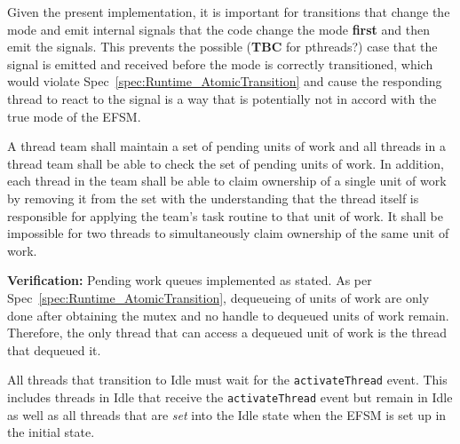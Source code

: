 \documentclass{article}
\newcommand{\taskroutine}        {task routine\xspace}
\begin{document}
Given the present implementation, it is important for transitions that
change the mode and emit internal signals that the code change the mode
\textbf{first} and then emit the signals.  This prevents the possible
(\textbf{TBC} for pthreads?) case that the signal is emitted and received before
the mode is correctly transitioned, which would violate
Spec~\ref{spec:Runtime_AtomicTransition} and cause the responding thread
to react to the signal is a way that is potentially not in accord with the true
mode of the EFSM.

\begin{spec}
A thread team shall maintain a set of pending units of work and all threads in a
thread team shall be able to check the set of pending units of work.  In
addition, each thread in the team shall be able to claim ownership of a single
unit of work by removing it from the set with the understanding that the thread
itself is responsible for applying the team's \taskroutine to that unit of work.  It
shall be impossible for two threads to simultaneously claim ownership of the
same unit of work.
\end{spec}
\textbf{Verification:}\hspace{0.125in}  Pending work queues implemented as
stated.  As per Spec~\ref{spec:Runtime_AtomicTransition}, dequeueing of units of
work are only done after obtaining the mutex and no handle to dequeued units of
work remain.  Therefore, the only thread that can access a dequeued unit of work
is the thread that dequeued it.
\begin{spec}
All threads that transition to Idle must wait for the \texttt{activateThread}
event.  This includes threads in Idle that receive the \texttt{activateThread}
event but remain in Idle as well as all threads that are \textit{set} into the
Idle state when the EFSM is set up in the initial state.
\label{spec:IdleActivateThread}
\end{spec}
\end{document}
